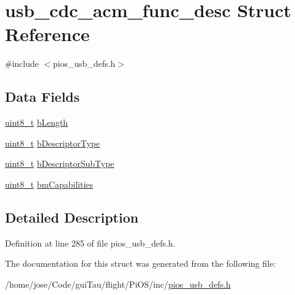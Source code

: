 \hypertarget{structusb__cdc__acm__func__desc}{\section{usb\-\_\-cdc\-\_\-acm\-\_\-func\-\_\-desc Struct Reference}
\label{structusb__cdc__acm__func__desc}
}


{\ttfamily \#include $<$pios\-\_\-usb\-\_\-defs.\-h$>$}

\subsection*{Data Fields}
\begin{DoxyCompactItemize}
\item 
\hyperlink{stdint_8h_aba7bc1797add20fe3efdf37ced1182c5}{uint8\-\_\-t} \hyperlink{group___p_i_o_s___u_s_b___d_e_f_s_gacda28d39ca47f4d77a24b7617ac2d693}{b\-Length}
\item 
\hyperlink{stdint_8h_aba7bc1797add20fe3efdf37ced1182c5}{uint8\-\_\-t} \hyperlink{group___p_i_o_s___u_s_b___d_e_f_s_ga10040b1863323e237a9c86859baaecb4}{b\-Descriptor\-Type}
\item 
\hyperlink{stdint_8h_aba7bc1797add20fe3efdf37ced1182c5}{uint8\-\_\-t} \hyperlink{group___p_i_o_s___u_s_b___d_e_f_s_ga08c4c22a13b05fac74e5f42a8a5bde68}{b\-Descriptor\-Sub\-Type}
\item 
\hyperlink{stdint_8h_aba7bc1797add20fe3efdf37ced1182c5}{uint8\-\_\-t} \hyperlink{group___p_i_o_s___u_s_b___d_e_f_s_gae29c71f4304b1f38e5ffcaf34ec9b182}{bm\-Capabilities}
\end{DoxyCompactItemize}


\subsection{Detailed Description}


Definition at line 285 of file pios\-\_\-usb\-\_\-defs.\-h.



The documentation for this struct was generated from the following file\-:\begin{DoxyCompactItemize}
\item 
/home/jose/\-Code/gui\-Tau/flight/\-Pi\-O\-S/inc/\hyperlink{pios__usb__defs_8h}{pios\-\_\-usb\-\_\-defs.\-h}\end{DoxyCompactItemize}
